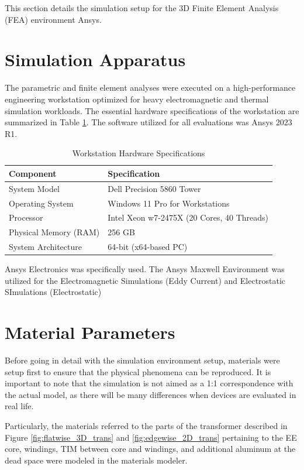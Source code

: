 This section details the simulation setup for the 3D Finite Element Analysis (FEA) environment Ansys.

\section*{Simulation Apparatus}
The parametric and finite element analyses were executed on a high-performance engineering workstation optimized for heavy electromagnetic and thermal simulation workloads. The essential hardware specifications of the workstation are summarized in Table \ref{tab:workstation}. The software utilized for all evaluations was Ansys 2023 R1.

\begin{table}[h!]
    \centering
    \caption{Workstation Hardware Specifications}
    \begin{tabular}{ll}
        \hline
        \textbf{Component} & \textbf{Specification} \\
        \hline \hline
        System Model & Dell Precision 5860 Tower \\
        Operating System & Windows 11 Pro for Workstations \\
        Processor & Intel Xeon w7-2475X (20 Cores, 40 Threads) \\
        Physical Memory (RAM) & 256 GB \\
        System Architecture & 64-bit (x64-based PC) \\
        \hline
    \end{tabular}
    \label{tab:workstation}
\end{table}

Ansys Electronics was specifically used. The Ansys Maxwell Environment was utilized for the Electromagnetic Simulations (Eddy Current) and Electrostatic SImulations (Electrostatic)

\section*{Material Parameters}
Before going in detail with the simulation environment setup, materials were setup first to ensure that the physical phenomena can be reproduced. It is important to note that the simulation is not aimed as a 1:1 correspondence with the actual model, as there will be many differences when devices are evaluated in real life. 

Particularly, the materials referred to the parts of the transformer described in Figure \ref{fig:flatwise_3D_trans} and \ref{fig:edgewise_2D_trans} pertaining to the EE core, windings, TIM between core and windings, and additional aluminum at the dead space were modeled in the materials modeler. 

